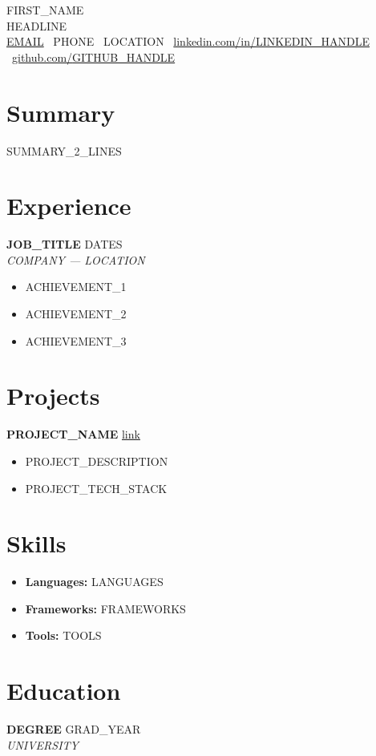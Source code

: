 \documentclass[10pt,a4paper]{article}
\begin{document}
\begin{center}
  {\Huge {{FIRST_NAME}} {\bfseries{}}}\\[4pt]
  {\small\color{darktext} {{HEADLINE}}}\\[6pt]
  {\footnotesize
    \href{mailto:{{EMAIL}}}{{{EMAIL}}} \textbar\
    {{PHONE}} \textbar\ {{LOCATION}} \textbar\
    \href{https://linkedin.com/in/{{LINKEDIN_HANDLE}}}{linkedin.com/in/{{LINKEDIN_HANDLE}}} \textbar\
    \href{https://github.com/{{GITHUB_HANDLE}}}{github.com/{{GITHUB_HANDLE}}}}
\end{center}

\section{Summary}
{{SUMMARY_2_LINES}}

\section{Experience}
\textbf{{{JOB_TITLE}}} \hfill {\color{awesome}\small {{DATES}}}\\
{\small\itshape {{COMPANY}} — {{LOCATION}}}
\begin{itemize}[leftmargin=*,nosep,itemsep=2pt]
  \item {{ACHIEVEMENT_1}}
  \item {{ACHIEVEMENT_2}}
  \item {{ACHIEVEMENT_3}}
\end{itemize}

\section{Projects}
\textbf{{{PROJECT_NAME}}} \hfill {\color{awesome}\small \href{{{PROJECT_URL}}}{link}}
\begin{itemize}[leftmargin=*,nosep,itemsep=2pt]
  \item {{PROJECT_DESCRIPTION}}
  \item {{PROJECT_TECH_STACK}}
\end{itemize}

\section{Skills}
\begin{itemize}[leftmargin=*,nosep,itemsep=2pt]
  \item \textbf{Languages:} {{LANGUAGES}}
  \item \textbf{Frameworks:} {{FRAMEWORKS}}
  \item \textbf{Tools:} {{TOOLS}}
\end{itemize}

\section{Education}
\textbf{{{DEGREE}}} \hfill {\color{awesome}\small {{GRAD_YEAR}}}\\
{\small\itshape {{UNIVERSITY}}}
\end{document}
